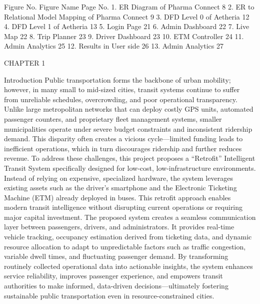 		
Figure No.	Figure Name	Page No.
1.		ER Diagram of Pharma Connect	8
2.		ER to Relational Model Mapping of Pharma Connect	9
3.		DFD Level 0 of Aetheria	12
4.		DFD Level 1 of Aetheria	13
5.		Login Page	21
6.		Admin Dashboard 	22
7.		Live Map	22
8.		Trip Planner 	23
9.		Driver Dashboard 	23
10.		ETM Controller 	24
11.		Admin Analytics 	25
12.		Results in User side	26
13.		Admin Analytics	27











 
CHAPTER 1

                                                Introduction
Public transportation forms the backbone of urban mobility; however, in many small to mid-sized cities, transit systems continue to suffer from unreliable schedules, overcrowding, and poor operational transparency. Unlike large metropolitan networks that can deploy costly GPS units, automated passenger counters, and proprietary fleet management systems, smaller municipalities operate under severe budget constraints and inconsistent ridership demand. This disparity often creates a vicious cycle—limited funding leads to inefficient operations, which in turn discourages ridership and further reduces revenue. 
To address these challenges, this project proposes a “Retrofit” Intelligent Transit System specifically designed for low-cost, low-infrastructure environments. Instead of relying on expensive, specialized hardware, the system leverages existing assets such as the driver’s smartphone and the Electronic Ticketing Machine (ETM) already deployed in buses. This retrofit approach enables modern transit intelligence without disrupting current operations or requiring major capital investment. 
The proposed system creates a seamless communication layer between passengers, drivers, and administrators. It provides real-time vehicle tracking, occupancy estimation derived from ticketing data, and dynamic resource allocation to adapt to unpredictable factors such as traffic congestion, variable dwell times, and fluctuating passenger demand. By transforming routinely collected operational data into actionable insights, the system enhances service reliability, improves passenger experience, and empowers transit authorities to make informed, data-driven decisions—ultimately fostering sustainable public transportation even in resource-constrained cities.









